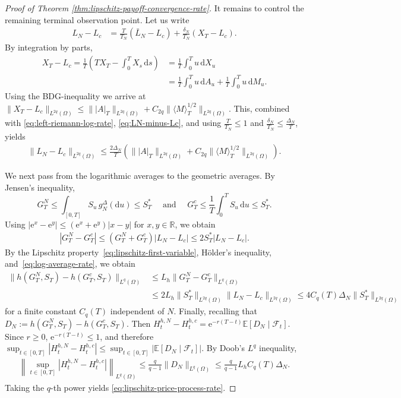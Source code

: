 \documentclass[10pt,a4paper]{amsart}
\begin{document}
\begin{proof}[Proof of Theorem \ref{thm:lipschitz-payoff-convergence-rate}]
    It remains to control the remaining terminal observation point. Let us write 
    \begin{align}\label{eq:LN-minus-Lc}
        L_N-L_c &= \frac{T}{T_N}(\bar L_N-L_c) + \frac{\delta_N}{T_N}(X_T-L_c).
    \end{align}
    By integration by parts,
    \begin{align*}
        X_T-L_c = \frac1T \left( TX_T-\int_0^TX_s\,\mathrm ds \right)
        &= \frac1T\int_0^T u\,\mathrm dX_u 
        \\ &= \frac1T\int_0^T u\,\mathrm dA_u + \frac1T\int_0^T u\,\mathrm dM_u.
    \end{align*}
    Using the BDG-inequality we arrive at $\|X_T-L_c\|_{L^{2q}(\Omega)} \leq \big\||A|_T\big\|_{L^{2q}(\Omega)} + C_{2q} \big\|\langle M\rangle_T^{1/2}\big\|_{L^{2q}(\Omega)}$. This, combined with \eqref{eq:left-riemann-log-rate}, \eqref{eq:LN-minus-Lc}, and using $\frac{T}{T_N}\leq1$ and $\frac{\delta_N}{T_N} \leq \frac{\Delta_N}{T}$, yields
    \begin{align}\label{eq:log-average-rate}
        \|L_N-L_c\|_{L^{2q}(\Omega)} \leq \frac{2\Delta_N}{T} \left( \big\||A|_T\big\|_{L^{2q}(\Omega)} + C_{2q} \big\|\langle M\rangle_T^{1/2}\big\|_{L^{2q}(\Omega)} \right).
    \end{align}
    
    We next pass from the logarithmic averages to the geometric averages. By Jensen's inequality,
    \[
        G_T^N \leq \int_{[0,T]}S_u\,g_N^\Delta(\mathrm du) \leq S_T^*\quad \text{ and } \quad G_T^c \leq \frac1T\int_0^T S_u\,\mathrm du \leq S_T^*.
    \]
    Using $ |\mathrm e^x-\mathrm e^y| \leq (\mathrm e^x+\mathrm e^y)|x-y|$ for $x,y\in\mathbb R$, we obtain 
    \begin{align*}
        |G_T^N-G_T^c| \leq (G_T^N+G_T^c)|L_N-L_c| \leq 2S_T^*|L_N-L_c|.
    \end{align*}
    By the Lipschitz property~\eqref{eq:lipschitz-first-variable}, H\"older's inequality, and~\eqref{eq:log-average-rate}, we obtain
    \begin{align*}
        \|h(G_T^N,S_T)-h(G_T^c,S_T)\|_{L^q(\Omega)} &\leq L_h \|G_T^N-G_T^c\|_{L^q(\Omega)} 
        \\ &\leq 2L_h \|S_T^*\|_{L^{2q}(\Omega)}\|L_N-L_c\|_{L^{2q}(\Omega)} 
        \leq 4C_q(T) \Delta_N \|S_T^*\|_{L^{2q}(\Omega)}
    \end{align*}
    for a finite constant $C_q(T)$ independent of $N$. Finally, recalling that $D_N := h(G_T^N,S_T)-h(G_T^c,S_T)$. Then $H_t^{h,N}-H_t^{h,c} = \mathrm e^{-r(T-t)} \mathbb E[D_N\mid\mathcal F_t]$. Since $r\geq0$, $\mathrm e^{-r(T-t)}\leq1$, and therefore $\sup_{t\in[0,T]} |H_t^{h,N}-H_t^{h,c}| \leq \sup_{t\in[0,T]} \left| \mathbb E[D_N\mid\mathcal F_t] \right|$. By Doob's $L^q$ inequality,
    \begin{align*}
        \left\| \sup_{t\in[0,T]} |H_t^{h,N}-H_t^{h,c}| \right\|_{L^q(\Omega)} \leq \frac{q}{q-1} \|D_N\|_{L^q(\Omega)} \leq \frac{q}{q-1} L_h C_q(T)\Delta_N.
    \end{align*}
    Taking the $q$-th power yields \eqref{eq:lipschitz-price-process-rate}.
\end{proof}
\end{document}
